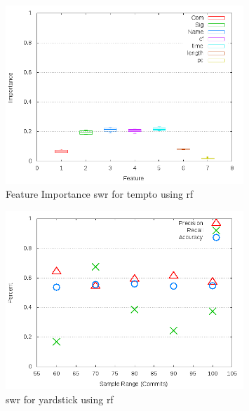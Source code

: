 \begin{figure}[!t]
\centering
\includegraphics[width=0.8\textwidth]{images/rf/test_1/tempto_importance.png}
\caption{Feature Importance \gls{swr} for tempto using \gls{rf}}
\label{fig:test_1_tempto_rf_importance}
\end{figure}

\begin{figure}[!t]
\centering
\includegraphics[width=0.8\textwidth]{images/rf/test_1/yardstick_sample_range.png}
\caption{\gls{swr} for yardstick using \gls{rf}}
\label{fig:test_1_yardstick_rf}
\end{figure}

